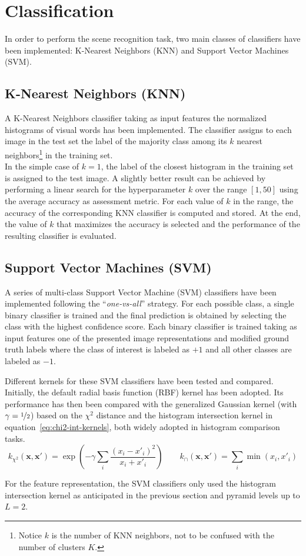 \documentclass[../main.tex]{subfiles}
\begin{document}
\section{Classification}\label{sec:classification}

In order to perform the scene recognition task, two main classes of classifiers have been implemented: K-Nearest Neighbors (KNN) and Support Vector Machines (SVM). 

\subsection{K-Nearest Neighbors (KNN)}\label{subsec:knn}

A K-Nearest Neighbors classifier taking as input features the normalized
histograms of visual words has been implemented. The classifier assigns to each
image in the test set the label of the majority class among its $k$ nearest
neighbors\footnote{Notice $k$ is the number of KNN neighbors, not to be confused with the number of clusters $K$.} in the training set.\\
In the simple case of $k=1$, the label of the closest histogram in the training set is assigned to the test image. 
A slightly better result can be achieved by performing a linear search for the
hyperparameter $k$ over the range $[1, 50]$ using the average accuracy as assessment metric. For each value of $k$ in the range, the accuracy of the corresponding KNN classifier is computed and stored. At the end, the value of $k$ that maximizes the accuracy is selected and the performance of the resulting classifier is evaluated. 

\subsection{Support Vector Machines (SVM)}\label{subsec:svm}

A series of multi-class Support Vector Machine (SVM) classifiers have been implemented
following the ``\textit{one-vs-all}'' strategy. For each possible class, a
single binary classifier is trained and the final prediction is obtained by
selecting the class with the highest confidence score. Each binary classifier is
trained taking as input features one of the presented image representations and
modified ground truth labels where the class of interest is labeled as $+1$ and all other classes are labeled as $-1$.

\pagebreak
Different kernels for these SVM classifiers have been tested and compared.
Initially, the default radial basis function (RBF) kernel has been adopted. Its
performance has then been compared with the generalized Gaussian kernel (with
$\gamma = \nicefrac{1}{2}$) based on
the $\chi^2$ distance and the histogram
intersection kernel in equation~\ref{eq:chi2-int-kernels}, both widely
adopted in histogram comparison tasks.
\begin{equation}\label{eq:chi2-int-kernels}
	k_{\chi^2}(\mathbf{x}, \mathbf{x}') = \exp\left(-\gamma \sum_i \frac{({x}_i
	- {x}'_i)^2}{{x}_i + {x}'_i}\right) 
	\quad \quad
	k_{\cap}(\mathbf{x}, \mathbf{x}') = \sum_i \min({x}_i, {x}'_i)
\end{equation}

For the  feature representation, the SVM classifiers only used
the histogram intersection kernel as anticipated in the previous section and
pyramid levels up to $L=2$.
\end{document}
